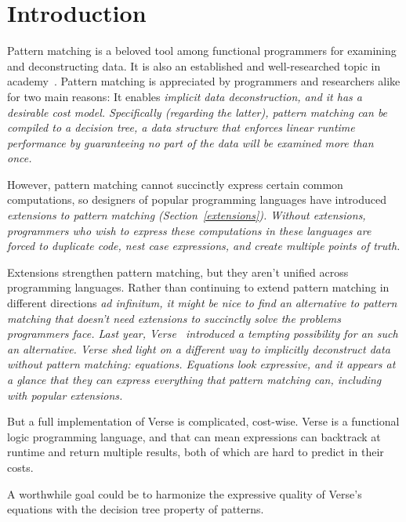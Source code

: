 \documentclass[manuscript,screen,review, 12pt, nonacm]{acmart}
\begin{document}
\section{Introduction}

Pattern matching is a beloved tool among functional programmers for examining
and deconstructing data. 
It is also an established and well-researched topic in
academy~\cite{burton1993pattern, palao1996new, wadler1987views, macqueen1985tree,
bpc}. Pattern matching is appreciated by programmers and researchers alike for
two main reasons: It enables \it{implicit} data deconstruction, and it has a
desirable cost model. Specifically (regarding the latter), pattern matching can
be compiled to a \it{decision tree}, a data structure that enforces linear
runtime performance by guaranteeing no part of the data will be examined more
than once.~\cite{maranget}

However, pattern matching cannot succinctly express certain common computations,
so designers of popular programming languages have introduced \it{extensions} to
pattern matching (Section~\ref{extensions}). Without extensions, programmers who
wish to express these computations in these languages are forced to duplicate
code, nest \it{case} expressions, and create multiple points of truth. 

Extensions strengthen pattern matching, but they aren't unified across
programming languages. Rather than continuing to extend pattern matching in
different directions \it{ad infinitum}, it might be nice to find an alternative
to pattern matching that doesn't need extensions to succinctly solve the
problems programmers face. Last year, Verse~\cite{verse} introduced
a tempting possibility for an such an alternative. Verse shed light on a
different way to implicitly deconstruct data without pattern matching:
\it{equations}. Equations look expressive, and it appears at a glance that they
can express everything that pattern matching can, including with popular
extensions. 

But a full implementation of Verse is complicated, cost-wise. Verse is a
functional logic programming language, and that can mean expressions can
backtrack at runtime and return multiple results, both of which are
hard to predict in their costs. 

A worthwhile goal could be to harmonize the expressive quality of Verse's
equations with the decision tree property of patterns.
\end{document}

